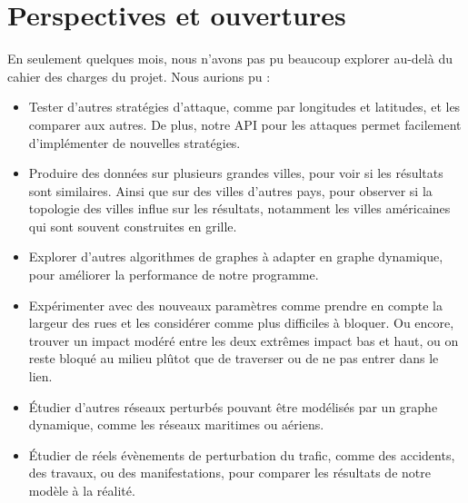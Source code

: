 \section{Perspectives et ouvertures}\label{sec:perspectives}

En seulement quelques mois, nous n'avons pas pu beaucoup explorer au-delà du cahier des charges du projet. Nous aurions pu :
\begin{itemize}
\item Tester d'autres stratégies d'attaque, comme par longitudes et latitudes, et les comparer aux autres.
De plus, notre API pour les attaques permet facilement d'implémenter de nouvelles stratégies.

\item Produire des données sur plusieurs grandes villes, pour voir si les résultats sont similaires.
Ainsi que sur des villes d'autres pays, pour observer si la topologie des villes influe sur les résultats, notamment les villes américaines qui sont souvent construites en grille.

\item Explorer d'autres algorithmes de graphes à adapter en graphe dynamique, pour améliorer la performance de notre programme.

\item Expérimenter avec des nouveaux paramètres comme prendre en compte la largeur des rues et les considérer comme plus difficiles à bloquer.
Ou encore, trouver un impact modéré entre les deux extrêmes impact bas et haut, ou on reste bloqué au milieu plûtot que de traverser ou de ne pas entrer dans le lien.

\item Étudier d'autres réseaux perturbés pouvant être modélisés par un graphe dynamique, comme les réseaux maritimes ou aériens.

\item Étudier de réels évènements de perturbation du trafic, comme des accidents, des travaux, ou des manifestations, pour comparer les résultats de notre modèle à la réalité.

\end{itemize}